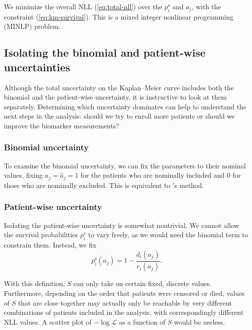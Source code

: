 \documentclass[pdflatex,sn-basic]{sn-jnl}%
\theoremstyle{thmstyleone}%
\theoremstyle{thmstyletwo}%
\theoremstyle{thmstylethree}%
\newcommand{\KM}{Kaplan--Meier} %
\begin{document}
We minimize the overall NLL (\ref{eq:total-nll}) over the \(p_i^\text{s}\) and \(a_j\), with the constraint (\ref{eq:km-survival}). This is a mixed integer nonlinear programming (MINLP) problem.

\subsection{Isolating the binomial and patient-wise uncertainties}\label{sec:isolating-uncertainties}

Although the total uncertainty on the \KM{} curve includes both the binomial and the patient-wise uncertainty, it is instructive to look at them separately. Determining which uncertainty dominates can help to understand the next steps in the analysis: should we try to enroll more patients or should we improve the biomarker measurements?

\subsubsection{Binomial uncertainty}

To examine the binomial uncertainty, we can fix the parameters to their nominal values, fixing \(a_j=\hat{a}_j=1\) for the patients who are nominally included and \(0\) for those who are nominally excluded. This is equivalent to \citeauthor{ThomasGrunkemeier}'s method.

\subsubsection{Patient-wise uncertainty}

Isolating the patient-wise uncertainty is somewhat nontrivial. We cannot allow the survival probabilities \(p_i^\text{s}\) to vary freely, as we would need the binomial term to constrain them. Instead, we fix
\begin{equation}
p_i^\text{s}(a_j) = 1 - \frac{d_i(a_j)}{r_i(a_j)}.
\end{equation}

With this definition, \(S\) can only take on certain fixed, discrete values. Furthermore, depending on the order that patients were censored or died, values of \(S\) that are close together may actually only be reachable by very different combinations of patients included in the analysis, with correspondingly different NLL values. A scatter plot of \(-\log\mathcal{L}\) as a function of \(S\) would be useless.
\end{document}
